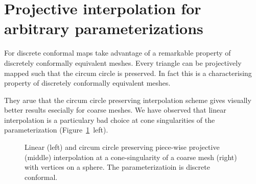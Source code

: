 \section[Projective interpolation for arbitrary parameterizations] %
{Projective interpolation for arbitrary parameterizations %
}

For discrete conformal maps \cite{Springborn2008} take advantage of a remarkable
property of discretely conformally equivalent meshes. Every triangle can be projectively 
mapped such that the circum circle is preserved. In fact this is a characterising property 
of discretely conformally equivalent meshes.

They arue that the circum circle preserving interpolation scheme gives visually better
results esecially for coarse meshes. We have observed that linear interpolation is a
particulary bad choice at cone singularities of the parameterization (Figure~\ref{fig:linear_projective_conformal}~left).

\begin{figure}
\centering
{}
\caption{Linear (left) and circum circle preserving piece-wise projective (middle) interpolation 
at a cone-singularity of a coarse mesh (right) with vertices on a sphere. The parameterizatioin is discrete conformal.}
\label{fig:linear_projective_conformal} 
\end{figure}


